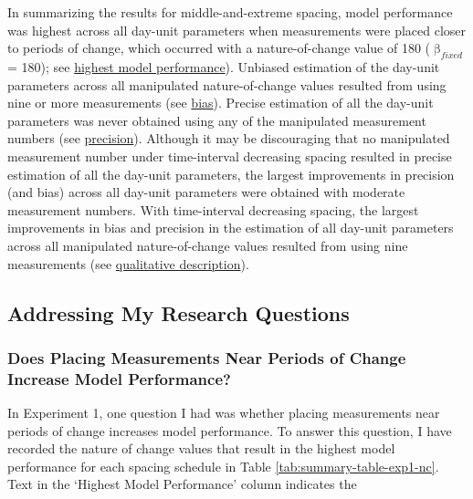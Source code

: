 \documentclass[
12pt, %
twoside,
english]{guelphthesis}
\begin{document}
In summarizing the results for middle-and-extreme spacing, model performance was highest across all day-unit parameters when measurements were placed closer to periods of change, which occurred with a nature-of-change value of 180 (\(\upbeta_{fixed}\) = 180); see \protect\hyperlink{nature-change-mid-ext-exp1}{highest model performance}). Unbiased estimation of the day-unit parameters across all manipulated nature-of-change values resulted from using nine or more measurements (see \protect\hyperlink{bias-time-dec-exp1}{bias}). Precise estimation of all the day-unit parameters was never obtained using any of the manipulated measurement numbers (see \protect\hyperlink{precision-time-dec-exp1}{precision}). Although it may be discouraging that no manipulated measurement number under time-interval decreasing spacing resulted in precise estimation of all the day-unit parameters, the largest improvements in precision (and bias) across all day-unit parameters were obtained with moderate measurement numbers. With time-interval decreasing spacing, the largest improvements in bias and precision in the estimation of all day-unit parameters across all manipulated nature-of-change values resulted from using nine measurements (see \protect\hyperlink{qualitative-time-inc-exp1}{qualitative description}).

\hypertarget{addressing-my-research-questions}{%
\subsection{Addressing My Research Questions}\label{addressing-my-research-questions}}

\hypertarget{meas-placing}{%
\subsubsection{Does Placing Measurements Near Periods of Change Increase Model Performance?}\label{meas-placing}}

In Experiment 1, one question I had was whether placing measurements near periods of change increases model performance. To answer this question, I have recorded the nature of change values that result in the highest model performance for each spacing schedule in Table \ref{tab:summary-table-exp1-nc}. Text in the `Highest Model Performance' column indicates the
\end{document}
